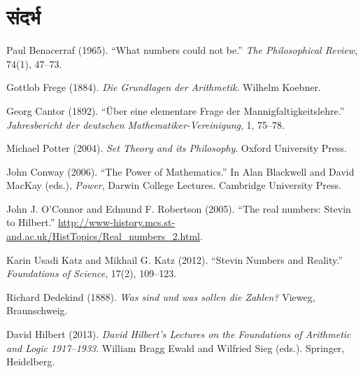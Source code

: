 \documentclass[11pt,a4paper,openany]{book}
\theoremstyle{definition}
\begin{document}
\chapter*{संदर्भ}
\label{bib:Benacerraf1965}
Paul Benacerraf (1965). ``What numbers could not be.''
\textit{The Philosophical Review}, 74(1), 47--73.

\par\medskip
Gottlob Frege (1884). \textit{Die Grundlagen der Arithmetik}.
Wilhelm Koebner.

Georg Cantor (1892). ``Über eine elementare Frage der
Mannigfaltigkeitslehre.'' \textit{Jahresbericht der deutschen
Mathematiker-Vereinigung}, 1, 75--78.

Michael Potter (2004). \textit{Set Theory and its Philosophy}.
Oxford University Press.

John Conway (2006). ``The Power of Mathematics.'' In Alan Blackwell
and David MacKay (eds.), \textit{Power}, Darwin College Lectures.
Cambridge University Press.

John J. O'Connor and Edmund F. Robertson (2005). ``The real numbers:
Stevin to Hilbert.''
\url{http://www-history.mcs.st-and.ac.uk/HistTopics/Real_numbers_2.html}.

Karin Usadi Katz and Mikhail G. Katz (2012). ``Stevin Numbers and
Reality.'' \textit{Foundations of Science}, 17(2), 109--123.

Richard Dedekind (1888). \textit{Was sind und was sollen die Zahlen?}
Vieweg, Braunschweig.

David Hilbert (2013). \textit{David Hilbert's Lectures on the Foundations
of Arithmetic and Logic 1917--1933}. William Bragg Ewald and Wilfried Sieg
(eds.). Springer, Heidelberg.
\end{document}
